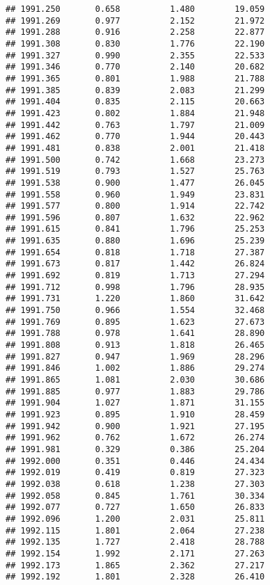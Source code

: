 \documentclass[]{book}
\begin{document}
\begin{verbatim}
## 1991.250       0.658          1.480        19.059
## 1991.269       0.977          2.152        21.972
## 1991.288       0.916          2.258        22.877
## 1991.308       0.830          1.776        22.190
## 1991.327       0.990          2.355        22.533
## 1991.346       0.770          2.140        20.682
## 1991.365       0.801          1.988        21.788
## 1991.385       0.839          2.083        21.299
## 1991.404       0.835          2.115        20.663
## 1991.423       0.802          1.884        21.948
## 1991.442       0.763          1.797        21.009
## 1991.462       0.770          1.944        20.443
## 1991.481       0.838          2.001        21.418
## 1991.500       0.742          1.668        23.273
## 1991.519       0.793          1.527        25.763
## 1991.538       0.900          1.477        26.045
## 1991.558       0.960          1.949        23.831
## 1991.577       0.800          1.914        22.742
## 1991.596       0.807          1.632        22.962
## 1991.615       0.841          1.796        25.253
## 1991.635       0.880          1.696        25.239
## 1991.654       0.818          1.718        27.387
## 1991.673       0.817          1.442        26.824
## 1991.692       0.819          1.713        27.294
## 1991.712       0.998          1.796        28.935
## 1991.731       1.220          1.860        31.642
## 1991.750       0.966          1.554        32.468
## 1991.769       0.895          1.623        27.673
## 1991.788       0.978          1.641        28.890
## 1991.808       0.913          1.818        26.465
## 1991.827       0.947          1.969        28.296
## 1991.846       1.002          1.886        29.274
## 1991.865       1.081          2.030        30.686
## 1991.885       0.977          1.883        29.786
## 1991.904       1.027          1.871        31.155
## 1991.923       0.895          1.910        28.459
## 1991.942       0.900          1.921        27.195
## 1991.962       0.762          1.672        26.274
## 1991.981       0.329          0.386        25.204
## 1992.000       0.351          0.446        24.434
## 1992.019       0.419          0.819        27.323
## 1992.038       0.618          1.238        27.303
## 1992.058       0.845          1.761        30.334
## 1992.077       0.727          1.650        26.833
## 1992.096       1.200          2.031        25.811
## 1992.115       1.801          2.064        27.238
## 1992.135       1.727          2.418        28.788
## 1992.154       1.992          2.171        27.263
## 1992.173       1.865          2.362        27.217
## 1992.192       1.801          2.328        26.410

\end{verbatim}
\end{document}
